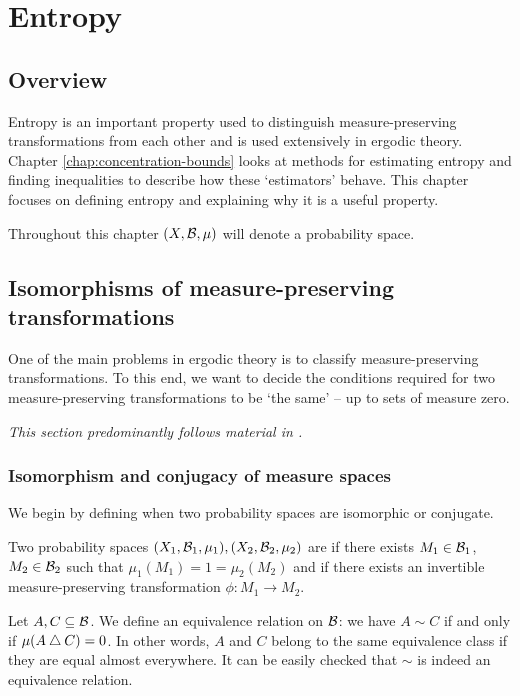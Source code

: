 \chapter{Entropy}
\section{Overview}
Entropy is an important property used to distinguish measure-preserving transformations from each other and is used extensively in ergodic theory. Chapter \ref{chap:concentration-bounds} looks at methods for estimating entropy and finding inequalities to describe how these `estimators' behave. This chapter focuses on defining entropy and explaining why it is a useful property.

Throughout this chapter $(X, \mathcal{B}, \mu)$ will denote a probability space.

\section{Isomorphisms of measure-preserving transformations}\label{sec:isos-of-mpts}
One of the main problems in ergodic theory is to classify measure-preserving transformations. To this end, we want to decide the conditions required for two measure-preserving transformations to be `the same' -- up to sets of measure zero.

\emph{This section predominantly follows material in \cite[Chapter 2]{walters:intro-to-ergodic-theory}.}

\subsection{Isomorphism and conjugacy of measure spaces}

We begin by defining when two probability spaces are isomorphic or conjugate.

\begin{definition}
	Two probability spaces $(X_1, \mathcal{B}_1, \mu_1), (X_2, \mathcal{B}_2, \mu_2)$ are  if there exists $M_1 \in \mathcal{B}_1$, $M_2 \in \mathcal{B}_2$ such that $\mu_1(M_1) = 1 = \mu_2(M_2)$ and if there exists an invertible measure-preserving transformation $\phi: M_1 \to M_2$.
\end{definition}

Let $A, C \subseteq \mathcal{B}$. We define an equivalence relation on $\mathcal{B}$: we have $A \sim C$ if and only if $\mu(A \bigtriangleup C) = 0$. In other words, $A$ and $C$ belong to the same equivalence class if they are equal almost everywhere. It can be easily checked that $\sim$ is indeed an equivalence relation.

